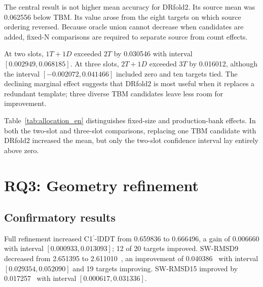 \documentclass[12pt,a4paper,oneside]{report}
\newcommand{\cprime}{C1$^{\prime}$}
\newcommand{\angstrom}{\text{\AA}}
\begin{document}
The central result is not higher mean accuracy for DRfold2. Its source mean was 0.062556
below TBM. Its value arose from the eight targets on which source ordering reversed.
Because oracle union cannot decrease when candidates are added, fixed-N comparisons are
required to separate source from count effects.

At two slots, $1T+1D$ exceeded $2T$ by 0.030546 with interval
$[0.002949,0.068185]$. At three slots, $2T+1D$ exceeded $3T$ by 0.016012, although the
interval $[-0.002072,0.041466]$ included zero and ten targets tied. The declining
marginal effect suggests that DRfold2 is most useful when it replaces a redundant
template; three diverse TBM candidates leave less room for improvement.

\begin{table}[H]
\centering
\caption{Candidate allocation with geometry refinement disabled.}
\label{tab:allocation_en}
\end{table}

Table~\ref{tab:allocation_en} distinguishes fixed-size and production-bank effects. In
both the two-slot and three-slot comparisons, replacing one TBM candidate with DRfold2
increased the mean, but only the two-slot confidence interval lay entirely above zero.

\section{RQ3: Geometry refinement}

\subsection{Confirmatory results}

Full refinement increased \cprime{}-lDDT from 0.659836 to 0.666496, a gain of 0.006660
with interval $[0.000933,0.013093]$; 12 of 20 targets improved. SW-RMSD9 decreased from
2.651395 to 2.611010~\angstrom{}, an improvement of 0.040386~\angstrom{} with interval
$[0.029354,0.052090]$ and 19 targets improving. SW-RMSD15 improved by
0.017257~\angstrom{} with interval $[0.000617,0.031336]$.
\end{document}

